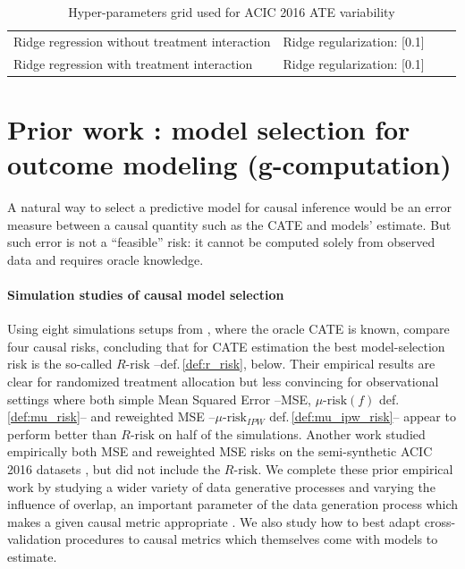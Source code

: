 \documentclass[unnumsec,webpdf,contemporary,large]{oup-authoring-template}%
\theoremstyle{thmstyleone}%
\theoremstyle{thmstyletwo}%
\theoremstyle{thmstylethree}%
\begin{document}
\begin{appendices}
\begin{table}[h!]
\begin{tabular}{llll}
            Ridge regression without treatment interaction & Ridge regularization:
            [0.1]                                                                  \\

            Ridge regression with treatment interaction    & Ridge regularization:
            [0.1]                                                                  \\
            \bottomrule
        \end{tabular}
        \caption{Hyper-parameters grid used for ACIC 2016 ATE variability}
        \label{apd:toy_example:acic_2016_ate_variability:table}
    \end{table}

    \section{Prior work : model selection for outcome modeling (g-computation)}\label{apd:prior_work}

    A natural way to select a predictive model for causal inference would be
    an error measure between a causal quantity such as the CATE and models' estimate. But such error is
    not a ``feasible'' risk: it cannot be computed solely from observed data
    and requires oracle knowledge.


    \paragraph{Simulation studies of causal model selection}

    Using eight simulations setups from \cite{powers_methods_2018}, where
    the oracle CATE is known, \cite{schuler_comparison_2018} compare four
    causal risks, concluding that for CATE estimation the best
    model-selection risk is the so-called $R\text{-risk}$
    \cite{nie_quasioracle_2017} --def.\,\ref{def:r_risk}, below. Their
    empirical results are clear for randomized treatment allocation but less
    convincing for observational settings where both simple Mean Squared
    Error --MSE, $\mu\text{-risk}(f)$ def.\,\ref{def:mu_risk}-- and
    reweighted MSE --$\mu\text{-risk}_{IPW}$ def.\,\ref{def:mu_ipw_risk}--
    appear to perform better than $R\text{-risk}$ on half of the simulations.
    Another work \cite{alaa_validating_2019} studied empirically both MSE and
    reweighted MSE risks on the semi-synthetic ACIC 2016 datasets
    \cite{dorie_automated_2019}, but did not include the $R\text{-risk}$. We complete these
    prior empirical work by studying a wider variety of data generative
    processes and varying the influence of overlap, an important parameter of
    the data generation process which makes a given causal metric appropriate
    \cite{damour_overlap_2020}. We also study how to best adapt
    cross-validation procedures to causal metrics which themselves come with
    models to estimate.


\end{appendices}
\end{document}
